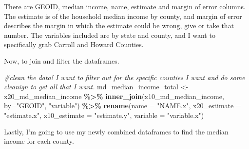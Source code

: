 \documentclass[
]{article}
\newenvironment{Shaded}{\begin{snugshade}}{\end{snugshade}}
\newcommand{\AttributeTok}[1]{\textcolor[rgb]{0.13,0.29,0.53}{#1}}
\newcommand{\CommentTok}[1]{\textcolor[rgb]{0.56,0.35,0.01}{\textit{#1}}}
\newcommand{\FunctionTok}[1]{\textcolor[rgb]{0.13,0.29,0.53}{\textbf{#1}}}
\newcommand{\NormalTok}[1]{#1}
\newcommand{\OtherTok}[1]{\textcolor[rgb]{0.56,0.35,0.01}{#1}}
\newcommand{\SpecialCharTok}[1]{\textcolor[rgb]{0.81,0.36,0.00}{\textbf{#1}}}
\newcommand{\StringTok}[1]{\textcolor[rgb]{0.31,0.60,0.02}{#1}}
\begin{document}
There are GEOID, median income, name, estimate and margin of error
columns. The estimate is of the household median income by county, and
margin of error describes the margin in which the estimate could be
wrong, give or take that number. The variables included are by state and
county, and I want to specifically grab Carroll and Howard Counties.

Now, to join and filter the dataframes.

\begin{Shaded}
\begin{Highlighting}[]
\CommentTok{\#clean the data! I want to filter out for the specific counties I want and do some cleanign to get all that I want.}
\NormalTok{md\_median\_income\_total }\OtherTok{\textless{}{-}}\NormalTok{ x20\_md\_median\_income }\SpecialCharTok{\%\textgreater{}\%} 
  \FunctionTok{inner\_join}\NormalTok{(x10\_md\_median\_income, }\AttributeTok{by=}\StringTok{"GEOID"}\NormalTok{, }\StringTok{"variable"}\NormalTok{) }\SpecialCharTok{\%\textgreater{}\%} 
  \FunctionTok{rename}\NormalTok{(}\AttributeTok{name =} \StringTok{"NAME.x"}\NormalTok{,}
         \AttributeTok{x20\_estimate =} \StringTok{"estimate.x"}\NormalTok{,}
         \AttributeTok{x10\_estimate =} \StringTok{"estimate.y"}\NormalTok{,}
         \AttributeTok{variable =} \StringTok{"variable.x"}\NormalTok{)}
\end{Highlighting}
\end{Shaded}

Lastly, I'm going to use my newly combined dataframes to find the median
income for each county.
\end{document}
